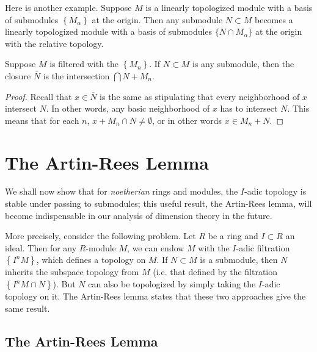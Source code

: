 Here is another example. Suppose $M$ is a linearly topologized module with a
basis of submodules $\left\{M_\alpha\right\}$ at the origin. Then any
submodule $N \subset M$ becomes a linearly topologized module with a basis of
submodules $\{N \cap M_\alpha\}$ at the origin with the relative topology.


\begin{proposition} 
Suppose $M$ is filtered with the $\left\{M_n\right\}$. If $N \subset M$ is any
submodule, then the closure $\overline{N}$ is the intersection $\bigcap N + M_n$.
\end{proposition} 
\begin{proof} 
Recall that $x \in \overline{N}$ is the same as stipulating that every
neighborhood of $x$ intersect $N$. In other words, any basic neighborhood of
$x$ has to intersect $N$. This means that for each $n$, $x+M_n \cap N \neq
\emptyset$, or in other words $x \in M_n + N$.
\end{proof} 
\section{The Artin-Rees Lemma}

We shall now show that for \emph{noetherian} rings and modules, the $I$-adic
topology is stable under passing to submodules; this useful result, the
Artin-Rees lemma, will become indispensable in our analysis of dimension
theory in the future.

More precisely, consider the following problem. Let $R$ be a ring and $I
\subset R$ an ideal. Then for any $R$-module $M$, we can endow $M$ with the
$I$-adic filtration $\left\{I^n M\right\}$, which defines a topology on $M$.
If $N \subset M$ is a submodule, then 
$N$ inherits the subspace topology from $M$ (i.e. that defined by the filtration
$\left\{I^n M \cap N\right\}$). But $N$ can also be topologized by simply
taking the $I$-adic topology on it. The Artin-Rees lemma states that these two
approaches give the same result.

\subsection{The Artin-Rees Lemma}

